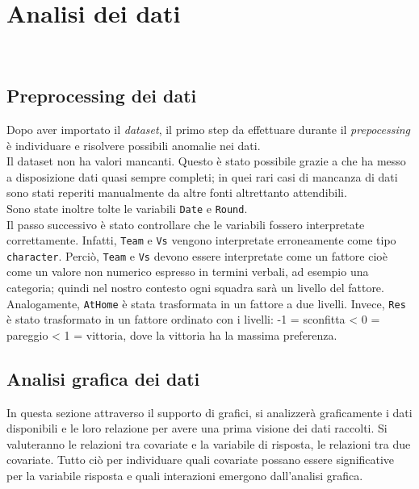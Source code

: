 
\chapter{Analisi dei dati}
\label{cap:Analisi}
\\


\section{Preprocessing dei dati}
Dopo aver importato il \emph{dataset}, il primo step da effettuare durante il \emph{prepocessing} è individuare e risolvere possibili anomalie nei dati.\\
Il dataset non ha valori mancanti. Questo è stato possibile grazie a \texttt{\cite{fbref}} che ha messo a disposizione dati quasi sempre completi; in quei rari casi di mancanza di dati sono stati reperiti manualmente da altre fonti altrettanto attendibili.\\ 
Sono state inoltre tolte le variabili \texttt{Date} e \texttt{Round}.\\
Il passo successivo è stato controllare che le variabili fossero interpretate correttamente. Infatti, \texttt{Team} e \texttt{Vs} vengono interpretate erroneamente come tipo \texttt{character}. Perciò, \texttt{Team} e \texttt{Vs} devono essere interpretate come un fattore cioè come un valore non numerico espresso in termini verbali, ad esempio una categoria; quindi nel nostro contesto ogni squadra sarà un livello del fattore. Analogamente, \texttt{AtHome} è stata trasformata in un fattore a due livelli. Invece, \texttt{Res} è stato trasformato in un fattore ordinato con i livelli: -1 = sconfitta <  0 = pareggio < 1 = vittoria, dove la vittoria ha la massima preferenza.


\section{Analisi grafica dei dati}
In questa sezione attraverso il supporto di grafici, si analizzerà graficamente i dati disponibili e le loro relazione per avere una prima visione dei dati raccolti. Si valuteranno le relazioni tra covariate e la variabile di risposta, le relazioni tra due covariate. Tutto ciò per individuare quali covariate possano essere significative per la variabile risposta e quali interazioni emergono dall'analisi grafica.\\

